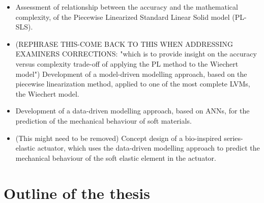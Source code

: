\begin{itemize}
    \item Assessment of relationship between the accuracy and the mathematical complexity, of the Piecewise Linearized Standard Linear Solid model (PL-SLS).
    \item (REPHRASE THIS-COME BACK TO THIS WHEN ADDRESSING EXAMINERS CORRECTIONS: "which is to provide insight on the accuracy versus complexity trade-off of applying the PL method to the Wiechert model") Development of a model-driven modelling approach, based on the piecewise linearization method, applied to one of the most complete LVMs, the Wiechert model.
    \item Development of a data-driven modelling approach, based on ANNs, for the prediction of the mechanical behaviour of soft materials.
    \item (This might need to be removed) Concept design of a bio-inspired series-elastic actuator, which uses the data-driven modelling approach to predict the mechanical behaviour of the soft elastic element in the actuator.
\end{itemize}

\section{Outline of the thesis}

